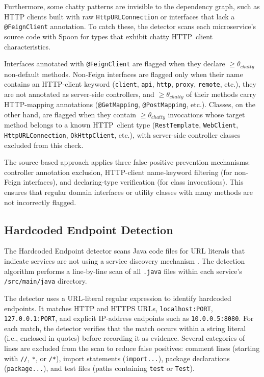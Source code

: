 Furthermore, some chatty patterns are invisible to the dependency graph, such as HTTP clients built with raw \texttt{HttpURLConnection} or interfaces that lack a \texttt{@Feign\-Client} annotation. To catch these, the detector scans each microservice's source code with Spoon for types that exhibit chatty HTTP~client characteristics.

Interfaces annotated with \texttt{@FeignClient} are flagged when they declare $\geq \theta_{\mathit{chatty}}$ non-default methods. Non-Feign interfaces are flagged only when their name contains an HTTP-client keyword (\texttt{client}, \texttt{api}, \texttt{http}, \texttt{proxy}, \texttt{remote}, etc.), they are not annotated as server-side controllers, and $\geq \theta_{\mathit{chatty}}$ of their methods carry HTTP-mapping annotations (\texttt{@GetMapping}, \texttt{@PostMapping}, etc.). Classes, on the other hand, are flagged when they contain $\geq \theta_{\mathit{chatty}}$ invocations whose target method belongs to a known HTTP~client type (\texttt{RestTemplate}, \texttt{WebClient}, \texttt{HttpURLConnection}, \texttt{OkHttpClient}, etc.), with server-side controller classes excluded from this check.

The source-based approach applies three false-positive prevention mechanisms: controller annotation exclusion, HTTP-client name-keyword filtering (for non-Feign interfaces), and declaring-type verification (for class invocations). This ensures that regular domain interfaces or utility classes with many methods are not incorrectly flagged.

\subsection{Hardcoded Endpoint Detection}
\label{subsec:detect-hardcoded-endpoint}

\par The Hardcoded Endpoint detector scans Java code files for URL literals that indicate services are not using a service discovery mechanism \cite{Taibi2020}. The detection algorithm performs a line-by-line scan of all \texttt{.java} files within each service's \texttt{/src/main/java} directory.

The detector uses a URL-literal regular expression to identify hardcoded endpoints. It matches HTTP and HTTPS URLs, \texttt{localhost:PORT}, \texttt{127.0.0.1:PORT}, and explicit IP-address endpoints such as \texttt{10.0.0.5:8080}.
For each match, the detector verifies that the match occurs within a string literal (i.e., enclosed in quotes) before recording it as evidence. Several categories of lines are excluded from the scan to reduce false positives: comment lines (starting with \texttt{//}, \texttt{*}, or \texttt{/*}), import statements (\texttt{import...}), package declarations (\texttt{package...}), and test files (paths containing \texttt{test} or \texttt{Test}).

